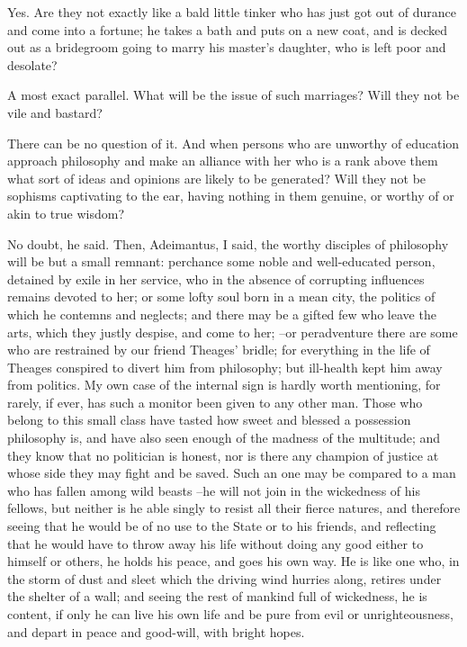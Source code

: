 Yes.
Are they not exactly like a bald little tinker who has just got out of durance and come into a fortune; he takes a bath and puts on a new coat, and is decked out as a bridegroom going to marry his master's daughter, who is left poor and desolate?

A most exact parallel.
What will be the issue of such marriages? Will they not be vile and bastard?

There can be no question of it.
And when persons who are unworthy of education approach philosophy and make an alliance with her who is a rank above them what sort of ideas and opinions are likely to be generated? Will they not be sophisms captivating to the ear, having nothing in them genuine, or worthy of or akin to true wisdom?

No doubt, he said.
Then, Adeimantus, I said, the worthy disciples of philosophy will be but a small remnant: perchance some noble and well-educated person, detained by exile in her service, who in the absence of corrupting influences remains devoted to her; or some lofty soul born in a mean city, the politics of which he contemns and neglects; and there may be a gifted few who leave the arts, which they justly despise, and come to her; --or peradventure there are some who are restrained by our friend Theages' bridle; for everything in the life of Theages conspired to divert him from philosophy; but ill-health kept him away from politics. My own case of the internal sign is hardly worth mentioning, for rarely, if ever, has such a monitor been given to any other man. Those who belong to this small class have tasted how sweet and blessed a possession philosophy is, and have also seen enough of the madness of the multitude; and they know that no politician is honest, nor is there any champion of justice at whose side they may fight and be saved. Such an one may be compared to a man who has fallen among wild beasts --he will not join in the wickedness of his fellows, but neither is he able singly to resist all their fierce natures, and therefore seeing that he would be of no use to the State or to his friends, and reflecting that he would have to throw away his life without doing any good either to himself or others, he holds his peace, and goes his own way. He is like one who, in the storm of dust and sleet which the driving wind hurries along, retires under the shelter of a wall; and seeing the rest of mankind full of wickedness, he is content, if only he can live his own life and be pure from evil or unrighteousness, and depart in peace and good-will, with bright hopes.

